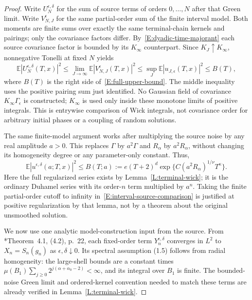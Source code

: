 \documentclass[12pt]{article}
\numberwithin{equation}{section}
\theoremstyle{definition}
\newcommand{\E}{\mathbb{E}}
\begin{document}
\begin{proof}
  Write $U_N^{\epsilon,\delta}$ for the sum of source terms of orders
  $0,\ldots,N$ after that Green limit. Write $V_{N,J}^\epsilon$ for the
  same partial-order sum of the finite interval model. Both moments are
  finite sums over exactly the same terminal-chain kernels and pairings;
  only the covariance factors differ. By~\eqref{E:dyadic-time-majorant}
  each source covariance factor is bounded by its $K_\infty$ counterpart.
  Since $K_J\uparrow K_\infty$, nonnegative Tonelli at fixed $N$ yields
  \begin{equation}\label{E:interval-source-comparison}
    \E|U_N^{\epsilon,\delta}(T,x)|^2
    \le\lim_{J\to\infty}\E|V_{N,J}^\epsilon(T,x)|^2
    \le\sup_J\E|u_{J,\epsilon}(T,x)|^2\le B(T),
  \end{equation}
  where $B(T)$ is the right side of~\eqref{E:full-upper-bound}.
  The middle inequality uses the positive pairing sum just identified.
  No Gaussian field of covariance $K_\infty\Gamma_\epsilon$ is constructed;
  $K_\infty$ is used only inside these monotone limits of positive integrals.
  This is entrywise comparison of Wick integrals, not covariance order
  for arbitrary initial phases or a coupling of random solutions.

  The same finite-model argument works after multiplying the source
  noise by any real amplitude $a>0$. This replaces $\Gamma$ by
  $a^2\Gamma$ and $R_\alpha$ by $a^2R_\alpha$, without changing its
  homogeneity degree or any parameter-only constant. Thus,
  \begin{equation}\label{E:regularized-scaled-moment}
    \E|u^{\epsilon,\delta}(a;T,x)|^2
    \le B(T;a):=e(T+2)^d
    \exp\{C(a^2R_\alpha)^{1/\nu}T^\kappa\}.
  \end{equation}
  Here the full regularized series exists by
  Lemma~\ref{L:terminal-wick}; it is the ordinary Duhamel series with
  its order-$n$ term multiplied by $a^n$. Taking the finite partial-order
  cutoff to infinity in~\eqref{E:interval-source-comparison} is justified
  at positive regularization by that lemma, not by a theorem about the
  original unsmoothed solution.

  We now use one analytic model-construction input from the source.
  From \cite{chen:author2026:time-dependency}*{Theorem~4.1, (4.2), p.~22},
  each fixed-order term $Y_n^{\epsilon,\delta}$ converges in $L^2$ to
  $X_n=S_n(g_n)$ as $\epsilon,\delta\downarrow0$.
  Its spectral assumption (1.5) follows from radial homogeneity: the
  large-shell bounds are a constant times
  $\mu(B_1)\sum_{j\ge0}2^{j(\alpha+\alpha_0-2)}<\infty$,
  and its integral over $B_1$ is finite.
  The bounded-noise Green limit and ordered-kernel convention needed
  to match these terms are already verified in
  Lemma~\ref{L:terminal-wick}.


\end{proof}
\end{document}
